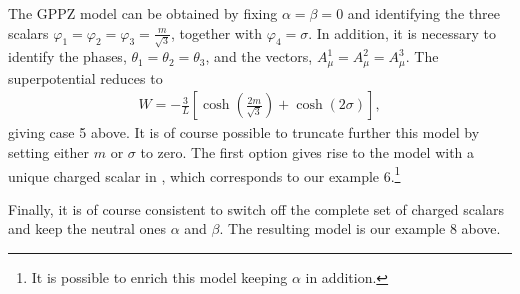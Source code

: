 The GPPZ model \cite{Girardello:1999bd} can be obtained by fixing $\alpha=\beta=0$ and identifying the three scalars $\varphi_1=\varphi_2=\varphi_3=\frac{m}{\sqrt{3}}$, together with $\varphi_4=\sigma$. In addition, it is necessary to identify the phases, $\theta_1=\theta_2=\theta_3$, and the vectors, $A_\mu^1=A_\mu^2=A_\mu^3$. The superpotential reduces to
\begin{align}
W=-\frac{3}{L}\left[\cosh\left(\frac{2m}{\sqrt{3}}\right)+\cosh(2\sigma)\right],
\end{align}
giving case 5 above. It is of course possible to truncate further this model by setting either $m$ or $\sigma$ to zero. The first option gives rise to the model with a unique charged scalar in \cite{Gubser:2009qm}, which corresponds to our example 6.\footnote{It is possible to enrich this model keeping $\alpha$ in addition.}

Finally, it is of course consistent to switch off the complete set of charged scalars and keep the neutral ones $\alpha$ and $\beta$. The resulting model is our example 8 above.

